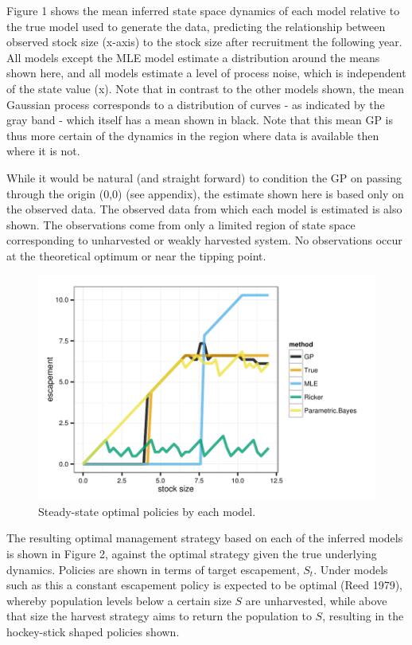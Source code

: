 \documentclass[author-year, review]{elsarticle} %
\makeatletter
\def\maxwidth{\ifdim\Gin@nat@width>\linewidth\linewidth
\else\Gin@nat@width\fi}
\let\Oldincludegraphics\includegraphics
\renewcommand{\includegraphics}[1]{\Oldincludegraphics[width=\maxwidth]{#1}}
\makeatother
\begin{document}
Figure 1 shows the mean inferred state space dynamics of each model
relative to the true model used to generate the data, predicting the
relationship between observed stock size (x-axis) to the stock size
after recruitment the following year. All models except the MLE model
estimate a distribution around the means shown here, and all models
estimate a level of process noise, which is independent of the state
value (x). Note that in contrast to the other models shown, the mean
Gaussian process corresponds to a distribution of curves - as indicated
by the gray band - which itself has a mean shown in black. Note that
this mean GP is thus more certain of the dynamics in the region where
data is available then where it is not.

While it would be natural (and straight forward) to condition the GP on
passing through the origin (0,0) (see appendix), the estimate shown here
is based only on the observed data. The observed data from which each
model is estimated is also shown. The observations come from only a
limited region of state space corresponding to unharvested or weakly
harvested system. No observations occur at the theoretical optimum or
near the tipping point.

\begin{figure}[htbp]
\centering
\includegraphics{Figure2.pdf}
\caption{Steady-state optimal policies by each model.}
\end{figure}

The resulting optimal management strategy based on each of the inferred
models is shown in Figure 2, against the optimal strategy given the true
underlying dynamics. Policies are shown in terms of target escapement,
$S_t$. Under models such as this a constant escapement policy is
expected to be optimal (Reed 1979), whereby population levels below a
certain size $S$ are unharvested, while above that size the harvest
strategy aims to return the population to $S$, resulting in the
hockey-stick shaped policies shown.
\end{document}
